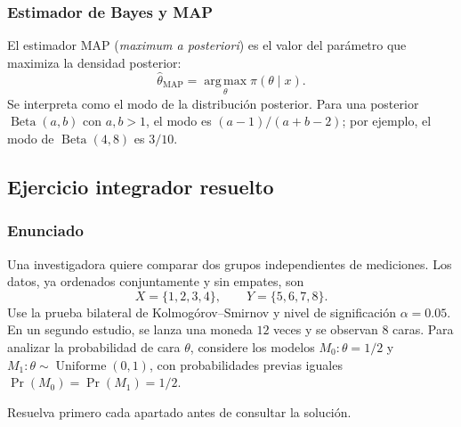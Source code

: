 \subsubsection{Estimador de Bayes y MAP}

El estimador MAP (\emph{maximum a posteriori}) es el valor del parámetro que maximiza la densidad posterior:
\[
  \widehat\theta_{\mathrm{MAP}}
  =\operatorname*{arg\,max}_{\theta}\pi(\theta\mid x).
\]
Se interpreta como el modo de la distribución posterior. Para una posterior $\operatorname{Beta}(a,b)$ con $a,b>1$, el modo es $(a-1)/(a+b-2)$; por ejemplo, el modo de $\operatorname{Beta}(4,8)$ es $3/10$.


\subsection{Ejercicio integrador resuelto}

\subsubsection*{Enunciado}

Una investigadora quiere comparar dos grupos independientes de mediciones. Los datos, ya ordenados conjuntamente y sin empates, son
\[
  X=\{1,2,3,4\},\qquad Y=\{5,6,7,8\}.
\]
Use la prueba bilateral de Kolmogórov--Smirnov y nivel de significación $\alpha=0.05$. En un segundo estudio, se lanza una moneda $12$ veces y se observan $8$ caras. Para analizar la probabilidad de cara $\theta$, considere los modelos $M_0:\theta=1/2$ y $M_1:\theta\sim\operatorname{Uniforme}(0,1)$, con probabilidades previas iguales $\Pr(M_0)=\Pr(M_1)=1/2$.

Resuelva primero cada apartado antes de consultar la solución.


